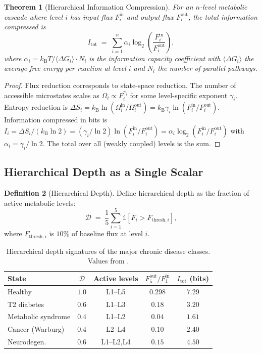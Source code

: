 \documentclass[11pt,twocolumn,a4paper]{article}
\newtheorem{theorem}{Theorem}[section]
\theoremstyle{definition}
\newtheorem{definition}[theorem]{Definition}
\theoremstyle{remark}
\newcommand{\kB}{k_{\mathrm{B}}}
\newcommand{\Dhier}{\mathcal{D}}
\newcommand{\Fin}{F^{\mathrm{in}}}
\newcommand{\Fout}{F^{\mathrm{out}}}
\newcommand{\Itot}{I_{\mathrm{tot}}}
\begin{document}
\begin{theorem}[Hierarchical Information Compression]
\label{thm:info-compression}
For an $n$-level metabolic cascade where level $i$ has input flux
$\Fin_i$ and output flux $\Fout_i$, the total information compressed
is
\begin{equation}
\Itot \;=\; \sum_{i=1}^{n} \alpha_i \log_2\!\left(\frac{\Fin_i}{\Fout_i}\right),
\end{equation}
where $\alpha_i = \kB T / \langle \Delta G_i \rangle \cdot N_i$ is the
information capacity coefficient with $\langle \Delta G_i \rangle$
the average free energy per reaction at level $i$ and $N_i$ the
number of parallel pathways.
\end{theorem}

\begin{proof}
Flux reduction corresponds to state-space reduction. The number of
accessible microstates scales as $\Omega_i \propto F_i^{\gamma_i}$
for some level-specific exponent $\gamma_i$. Entropy reduction is
$\Delta S_i = \kB \ln(\Omega_i^{\mathrm{in}}/\Omega_i^{\mathrm{out}})
= \kB \gamma_i \ln(\Fin_i/\Fout_i)$. Information compressed in bits
is $I_i = \Delta S_i / (\kB \ln 2) = (\gamma_i / \ln 2)
\ln(\Fin_i/\Fout_i) = \alpha_i \log_2(\Fin_i/\Fout_i)$ with
$\alpha_i = \gamma_i/\ln 2$. The total over all (weakly coupled)
levels is the sum.
\end{proof}

\subsection{Hierarchical Depth as a Single Scalar}

\begin{definition}[Hierarchical Depth]
\label{def:depth}
Define hierarchical depth as the fraction of active metabolic levels:
\begin{equation}
\Dhier \;=\; \frac{1}{5} \sum_{i=1}^{5} \mathbb{1}\!\left[F_i > F_{\mathrm{thresh},i}\right],
\end{equation}
where $F_{\mathrm{thresh},i}$ is $10\%$ of baseline flux at level $i$.
\end{definition}

\begin{table}[H]
\centering
\small
\begin{tabular}{lcccc}
\toprule
\textbf{State} & $\Dhier$ & \textbf{Active levels} & $\Fout_5/\Fin_1$ & $\Itot$ (bits) \\
\midrule
Healthy & $1.0$ & L1--L5 & $0.298$ & $7.29$ \\
T2 diabetes & $0.6$ & L1--L3 & $0.18$ & $3.20$ \\
Metabolic syndrome & $0.4$ & L1--L2 & $0.04$ & $1.61$ \\
Cancer (Warburg) & $0.4$ & L2--L4 & $0.10$ & $2.40$ \\
Neurodegen. & $0.6$ & L1--L2,L4 & $0.15$ & $4.50$ \\
\bottomrule
\end{tabular}
\caption{Hierarchical depth signatures of the major chronic disease
classes. Values from \citet{newgard2017, defronzo2009, vander2009,
swerdlow2014}.}
\label{tab:depth-signatures}
\end{table}
\end{document}
